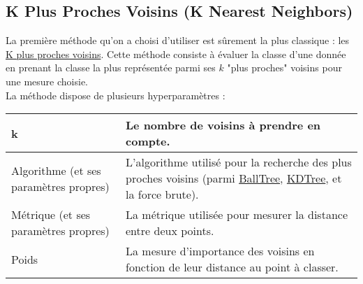 \subsection{K Plus Proches Voisins (K Nearest Neighbors)}

La première méthode qu'on a choisi d'utiliser est sûrement la plus classique : les \href{https://scikit-learn.org/stable/modules/generated/sklearn.neighbors.KNeighborsClassifier.html}{K plus proches voisins}. Cette méthode consiste à évaluer la classe d'une donnée en prenant la classe la plus représentée parmi ses $k$ "plus proches" voisins pour une mesure choisie.\\

La méthode dispose de plusieurs hyperparamètres :

\noindent
\begin{tabularx}{\textwidth}{|X|X|}
    \hline
    k & Le nombre de voisins à prendre en compte.\\\hline
    Algorithme (et ses paramètres propres) & L'algorithme utilisé pour la recherche des plus proches voisins (parmi \href{https://scikit-learn.org/stable/modules/generated/sklearn.neighbors.BallTree.htm}{BallTree}, \href{https://scikit-learn.org/stable/modules/generated/sklearn.neighbors.KDTree.html}{KDTree}, et la force brute). \\\hline
    Métrique (et ses paramètres propres) & La métrique utilisée pour mesurer la distance entre deux points. \\\hline
    Poids & La mesure d'importance des voisins en fonction de leur distance au point à classer.\\\hline
\end{tabularx}